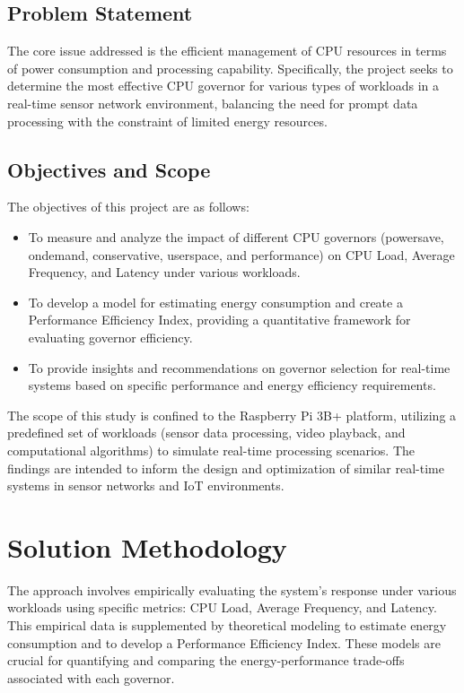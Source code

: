 \documentclass[conference]{IEEEtran}
\begin{document}
\subsection{Problem Statement}
The core issue addressed is the efficient management of CPU resources in terms of power consumption and processing capability. Specifically, the project seeks to determine the most effective CPU governor for various types of workloads in a real-time sensor network environment, balancing the need for prompt data processing with the constraint of limited energy resources.

\subsection{Objectives and Scope}
The objectives of this project are as follows:
\begin{itemize}
    \item To measure and analyze the impact of different CPU governors (powersave, ondemand, conservative, userspace, and performance) on CPU Load, Average Frequency, and Latency under various workloads.
    \item To develop a model for estimating energy consumption and create a Performance Efficiency Index, providing a quantitative framework for evaluating governor efficiency.
    \item To provide insights and recommendations on governor selection for real-time systems based on specific performance and energy efficiency requirements.
\end{itemize}
The scope of this study is confined to the Raspberry Pi 3B+ platform, utilizing a predefined set of workloads (sensor data processing, video playback, and computational algorithms) to simulate real-time processing scenarios. The findings are intended to inform the design and optimization of similar real-time systems in sensor networks and IoT environments.

\section{Solution Methodology}
The approach involves empirically evaluating the system's response under various workloads using specific metrics: CPU Load, Average Frequency, and Latency. This empirical data is supplemented by theoretical modeling to estimate energy consumption and to develop a Performance Efficiency Index. These models are crucial for quantifying and comparing the energy-performance trade-offs associated with each governor.
\end{document}
